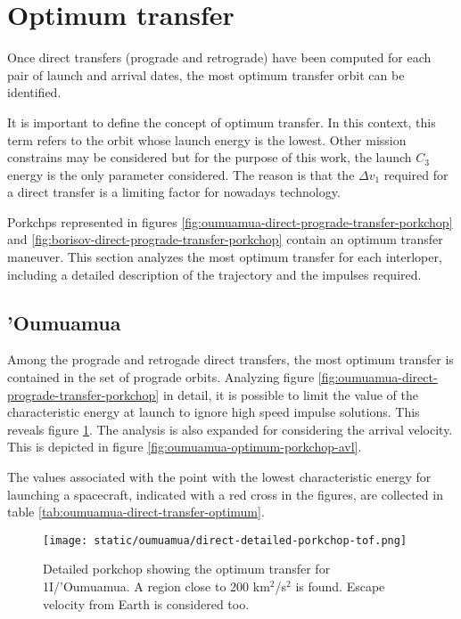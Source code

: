 \section{Optimum transfer}

Once direct transfers (prograde and retrograde) have been computed for each pair
of launch and arrival dates, the most optimum transfer orbit can be identified.

It is important to define the concept of optimum transfer. In this context, this
term refers to the orbit whose launch energy is the lowest. Other mission
constrains may be considered but for the purpose of this work, the launch $C_3$
energy is the only parameter considered. The reason is that the $\Delta v_1$
required for a direct transfer is a limiting factor for nowadays technology.

Porkchps represented in figures
\ref{fig:oumuamua-direct-prograde-transfer-porkchop} and
\ref{fig:borisov-direct-prograde-transfer-porkchop} contain an optimum transfer
maneuver. This section analyzes the most optimum transfer for each interloper,
including a detailed description of the trajectory and the impulses required.

\subsection{'Oumuamua}

Among the prograde and retrogade direct transfers, the most optimum transfer is
contained in the set of prograde orbits. Analyzing figure
\ref{fig:oumuamua-direct-prograde-transfer-porkchop} in detail, it is possible
to limit the value of the characteristic energy at launch to ignore high speed
impulse solutions. This reveals figure \ref{fig:oumuamua-optimum-porkchop}. The
analysis is also expanded for considering the arrival velocity. This is depicted
in figure \ref{fig:oumuamua-optimum-porkchop-avl}.

The values associated with the point with the lowest characteristic energy for
launching a spacecraft, indicated with a red cross in the figures, are collected
in table \ref{tab:oumuamua-direct-transfer-optimum}.

\begin{figure}[H]
  \centering
  \texttt{[image: static/oumuamua/direct-detailed-porkchop-tof.png]}
        \caption[Detailed porkchop showing the optimum transfer for
        1I/'Oumuamua with the time of flight.]{Detailed porkchop showing the optimum transfer for
        1I/'Oumuamua. A region close to 200 km$^2$/s$^2$ is found. Escape
        velocity from Earth is considered too.
  }
  \label{fig:oumuamua-optimum-porkchop}
\end{figure}

